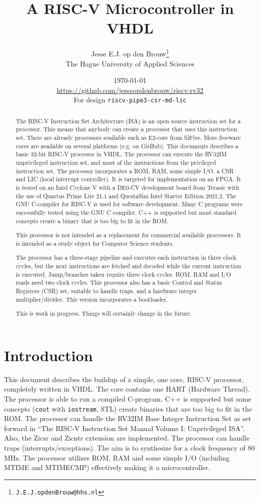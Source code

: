 \documentclass[12pt]{article}
\author{Jesse E.J. op den Brouw\thanks{\texttt{J.E.J.opdenBrouw@hhs.nl}}\\[2ex]The Hague University of Applied Sciences}
\title{A RISC-V Microcontroller in VHDL}
\date{\today\\[2ex]\normalsize\url{https://github.com/jesseopdenbrouw/riscv-rv32}\\[2ex]For design \texttt{riscv-pipe3-csr-md-lic}}
\begin{document}
\maketitle

\vfill
\begin{abstract}
\baselineskip
\noindent
The RISC-V Instruction Set Architecture (ISA) is an open source instruction set for a processor. This means that anybody can create a processor that uses this instruction set. There are already processors available such as E2-core from SiFive. More freeware cores are available on several platforms (e.g. on GitHub). This documents describes a basic 32-bit RISC-V processor in VHDL. The processor can execute the RV32IM unprivileged instruction set, and most of the instructions from the privileged instruction set. The processor incorporates a ROM, RAM, some simple I/O, a CSR and LIC (local interrupt controller). It is targeted for implementation on an FPGA. It is tested on an Intel Cyclone V with a DE0-CV development board from Terasic with the use of Quartus Prime Lite 21.1 and QuestaSim Intel Starter Edition 2021.2. The GNU C-compiler for RISC-V is used for software development. Many C programs were successfully tested using the GNU C compiler. C++ is supported but most standard concepts create a binary that is too big to fit in the ROM.

\noindent
This processor is not intended as a replacement for commercial available processors. It is intended as a study object for Computer Science students.

\noindent
The processor has a three-stage pipeline and executes each instruction in three clock cycles, but the next instructions are fetched and decoded while the current instruction is executed. Jump/branches taken require three clock cycles. ROM, RAM and I/O reads need two clock cycles. This processor also has a basic Control and Status Registers (CSR) set, suitable to handle traps, and a hardware integer multiplier/divider. This version incorporates a bootloader.

\noindent
This is work in progress. Things will certainly change in the future.
\end{abstract}
\vfill

\clearpage
\tableofcontents

\clearpage
\section{Introduction}
This document describes the buildup of a simple, one core, RISC-V processor, completely written in VHDL. The core contains one HART (Hardware Thread). The processor is able to run a compiled C-program. C++ is supported but some concepts (\texttt{cout} with \texttt{iostream}, STL) create binaries that are too big to fit in the ROM. The processor can handle the RV32IM Base Integer Instruction Set as set forward in ``The RISC-V Instruction Set Manual Volume I: Unprivileged ISA''. Also, the Zicsr and Zicntr extension are implemented. The processor can handle traps (interrupts/exceptions). The aim is to synthesize for a clock frequency of 80\,MHz. The processor utilizes ROM, RAM and some simple I/O (including MTIME and MTIMECMP) effectively making it a microcontroller.
\end{document}
